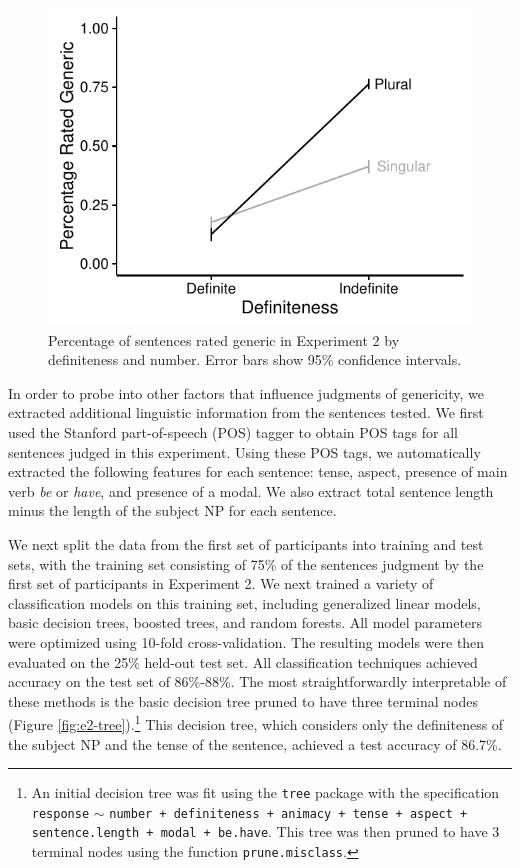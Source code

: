 \documentclass[10pt,letterpaper]{article}
\begin{document}
\begin{figure}[t]
\centering
\includegraphics[width=.8\linewidth]{figures/e2-2016.pdf}
\caption{\label{fig:e2} Percentage of sentences rated generic in Experiment 2 by definiteness and number. Error bars show 95\% confidence intervals.}
\end{figure}

In order to probe into other factors that influence judgments of genericity, we extracted additional linguistic information from the sentences tested. We first used the Stanford part-of-speech (POS) tagger \cite{Toutanova:2003} to obtain POS tags for all sentences judged in this experiment. Using these POS tags, we automatically extracted the following features for each sentence: tense, aspect, presence of main verb \textit{be} or \textit{have}, and presence of a modal. We also extract total sentence length minus the length of the subject NP for each sentence.

We next split the data from the first set of participants into training and test sets, with the training set consisting of 75\% of the sentences judgment by the first set of participants in Experiment 2. We next trained a variety of classification models on this training set, including generalized linear models, basic decision trees, boosted trees, and random forests. All model parameters were optimized using 10-fold cross-validation. The resulting models were then evaluated on the 25\% held-out test set. All classification techniques achieved accuracy on the test set of 86\%-88\%. The most straightforwardly interpretable of these methods is the basic decision tree pruned to have three terminal nodes (Figure \ref{fig:e2-tree}).\footnote{An initial decision tree was fit using the \texttt{tree} package with the specification \texttt{response} \(\sim\) \texttt{number + definiteness + animacy + tense + aspect + sentence.length + modal + be.have}. This tree was then pruned to have 3 terminal nodes using the function \texttt{prune.misclass}.}  This decision tree, which considers only the definiteness of the subject NP and the tense of the sentence,  achieved a test accuracy of 86.7\%.
\end{document}
